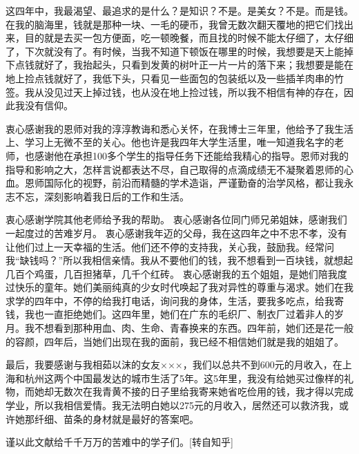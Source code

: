 \documentclass[a4paper,zihao=-4,UTF8]{ctexart}
\numberwithin{equation}{section}
\begin{document}
这四年中，我最渴望、最追求的是什么？是知识？不是。是美女？不是。而是钱。在我的脑海里，钱就是那种一块、一毛的硬币，我曾无数次翻天覆地的把它们找出来，目的就是去买一包方便面，吃一顿晚餐，而且找的时候不能太仔细了，太仔细了，下次就没有了。有时候，当我不知道下顿饭在哪里的时候，我想要是天上能掉下点钱就好了，我抬起头，只看到发黄的树叶正一片一片的落下来；我想要是能在地上捡点钱就好了，我低下头，只看见一些面包的包装纸以及一些插羊肉串的竹签。我从没见过天上掉过钱，也从没在地上捡过钱，所以我不相信有神的存在，因此我没有信仰。

衷心感谢我的恩师对我的淳淳教诲和悉心关怀，在我博士三年里，他给予了我生活上、学习上无微不至的关心。他也许是我四年大学生活里，唯一知道我名字的老师，也感谢他在承担100多个学生的指导任务下还能给我精心的指导。恩师对我的指导和影响之大，怎样言说都表达不尽，自己取得的点滴成绩无不凝聚着恩师的心血。恩师国际化的视野，前沿而精髓的学术造诣，严谨勤奋的治学风格，都让我永志不忘，深刻影响着我日后的工作和生活。

衷心感谢学院其他老师给予我的帮助。 衷心感谢各位同门师兄弟姐妹，感谢我们一起度过的苦难岁月。 衷心感谢我年迈的父母，我在这四年之中不忠不孝，没有让他们过上一天幸福的生活。他们还不停的支持我，关心我，鼓励我。经常问我“缺钱吗？”所以我相信亲情。我从不要他们的钱，我不想看到一百块钱，就想起几百个鸡蛋，几百担猪草，几千个红砖。 衷心感谢我的五个姐姐，是她们陪我度过快乐的童年。她们美丽纯真的少女时代唤起了我对异性的尊重与渴求。她们在我求学的四年中，不停的给我打电话，询问我的身体，生活，要我多吃点，给我寄钱，我也一直拒绝她们。这四年里，她们在广东的毛织厂、制衣厂过着非人的岁月。我不想看到那种用血、肉、生命、青春换来的东西。四年前，她们还是花一般的容颜，四年后，当她们出现在我的面前，我已经不相信她们就是我的姐姐了。

最后，我要感谢与我相茹以沫的女友×××，我们以总共不到600元的月收入，在上海和杭州这两个中国最发达的城市生活了5年。这5年里，我没有给她买过像样的礼物，而她却无数次在我青黄不接的日子里给我寄来她省吃俭用的钱，我才得以完成学业，所以我相信爱情。我无法明白她以275元的月收入，居然还可以救济我，或许她那纤细、苗条的身材就是最好的答案吧。

谨以此文献给千千万万的苦难中的学子们。[转自知乎]
\end{document}
